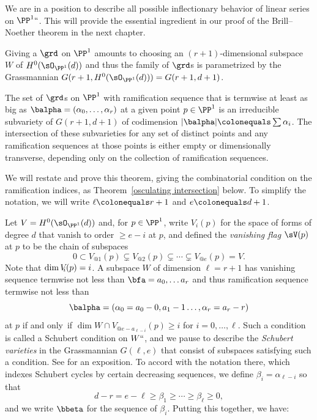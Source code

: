 We are in a position to describe all possible inflectionary behavior of
%
%
linear series on $\PP^1` `$. This will provide the essential ingredient
in our proof of the Brill--Noether theorem in the next chapter.

Giving a
$\grd$
%
on $\PP^{1}$ amounts to choosing an $(r+1)$-dimensional
subspace $W$ of  $H^{0}(\sO_{\PP^{1}}(d))$ and thus the family of $\grd$s
is parametrized by the
Grassmannian
%
$G(r+1, H^{0}(\sO_{\PP^{1}}(d))) = G(r+1, d+1)$.

\begin{theorem}\label{transversality of ramification}
The set of $\grd$s on $\PP^{1}$  with ramification sequence that is
termwise at least as big as $\balpha = (\alpha_{0}, \dots, \alpha_{r})$
at a
given point $p\in \PP^{1}$
is an irreducible subvariety of $G(r+1,d+1)$ of codimension
$|\balpha| \colonequals  \sum \alpha_{i}$. The intersection
of these subvarieties for any set of distinct points and any ramification
sequences at those points
is either empty or
%
dimensionally transverse, depending only on the
collection of
ramification sequences.
%
\end{theorem}

We will restate and prove this theorem, giving the combinatorial condition
on the ramification indices,
as Theorem~\ref{osculating intersection} below. To simplify the notation,
we will write $\ell \colonequals  r+1$
and
$e\colonequals  d+1$.


Let $V =H^{0}(\sO_{\PP^{1}}(d))$ and, for $p\in \PP^{1}$, write $V_{i}(p)$
for the space of
forms of degree $d$ that vanish to order $\geq e-i$ at $p$, and defined
%
the \emph{vanishing flag} $\sV(p)$ at $p$
to be the chain of subspaces
$$
0\subset V_{@1}(p) \subsetneq V_{@2}(p) \subsetneq\cdots\subsetneq V_{@e}(p)
= V.
$$
Note that $\dim V_{\mskip-5mu i}(p) = i$.
A subspace $W$ of dimension $\ell = r+1$ has vanishing sequence termwise
not less than
$\bfa = a_{0}, \dots a_{r}$ and thus
ramification sequence termwise not less than
$$
\balpha = (\alpha_{0} = a_{0}-0, a_{1}-1 \dots, \alpha_{r}= a_{r}-r)
$$
 at $p$ if and only~if
$\dim W\cap V_{@e-a_{\ell-i}}(p)\geq  i$  for  $i = 0,\dots, \ell$.
Such a condition is called a
Schubert condition
%
%
on $W` `$, and we pause to describe the \emph{Schubert varieties} in
the Grassmannian $G(\ell, e)$ that consist
of subspaces satisfying such a condition. See
\cite[Chapters
3 and 4]{3264} for an exposition.
To accord with the notation there, which indexes Schubert cycles by
certain decreasing sequences,
we define $\beta_{i} = \alpha_{\ell-i}$ so that
$$
d-r = e-\ell \geq \beta_{1} \geq \cdots \geq \beta_{\ell}\geq 0,
$$
and we write $\bbeta$ for the sequence of $\beta_{i}$. Putting this
together, we have:

